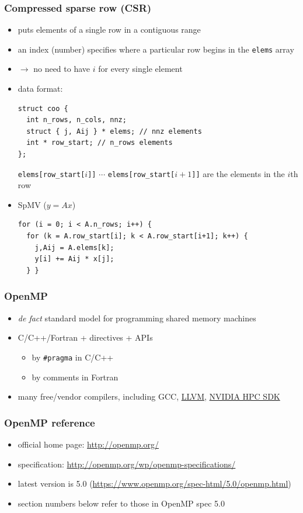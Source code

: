 \documentclass[12pt,dvipdfmx]{beamer}
\newcommand{\ao}[1]{{\color{blue}#1}}
\begin{document}
\begin{frame}[fragile]
  \frametitle{Compressed sparse row (CSR)}
  \begin{itemize}
  \item puts elements of a single row in a contiguous range 
  \item an index (number) specifies where a particular row begins
    in the {\tt elems} array
  \item $\rightarrow$ no need to have $i$ for every single element
  \item data format:
\begin{lstlisting}
struct coo {
  int n_rows, n_cols, nnz;    
  struct { j, Aij } * elems; // nnz elements
  int * row_start; // n_rows elements
};
\end{lstlisting}
{\tt elems[row\_start[$i$]]} $\cdots$ {\tt elems[row\_start[$i+1$]]}
are the elements in the $i$th row
\item SpMV ($y = Ax$)
\begin{lstlisting}
for (i = 0; i < A.n_rows; i++) {
  for (k = A.row_start[i]; k < A.row_start[i+1]; k++) {
    j,Aij = A.elems[k];
    y[i] += Aij * x[j];
  } }
\end{lstlisting}
\end{itemize}
\end{frame}


\begin{frame}
\frametitle{OpenMP}
\begin{itemize}
\item {\em de fact\/} standard model for programming shared memory machines
\item C/C++/Fortran + \ao{directives + APIs}
  \begin{itemize}
  \item by \ao{\tt \#pragma} in C/C++
  \item by comments in Fortran
  \end{itemize}
\item many free/vendor compilers, including GCC,
  \href{https://llvm.org/}{LLVM},
  \href{https://docs.nvidia.com/hpc-sdk/index.html}{NVIDIA HPC SDK}
\end{itemize}
\end{frame}


\begin{frame}
\frametitle{OpenMP reference}
\begin{itemize}
\item official home page:
  \url{http://openmp.org/}
\item specification:
  \url{http://openmp.org/wp/openmp-specifications/}
\item latest version is 5.0
(\url{https://www.openmp.org/spec-html/5.0/openmp.html})
\item section numbers below refer to those in OpenMP spec 5.0
\end{itemize}

\end{frame}
\end{document}
